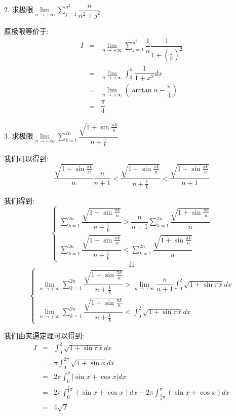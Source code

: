 2. 求极限$\lim\limits_{n\rightarrow+\infty}\sum\limits_{j=1}^{n^2}\dfrac{n}{n^2+j^2}$
\begin{solution}
	
	原极限等价于: 
	\begin{eqnarray*}
		I&=&\lim\limits_{n\rightarrow+\infty}\sum\limits_{j=1}^{n^2}\dfrac{1}{n}\dfrac{1}{1+(\frac{j}{n})^2}\\
		&=&\lim\limits_{n\rightarrow+\infty}\int_{0}^{n}\dfrac{1}{1+x^2}dx\\
		&=&\lim\limits_{n\rightarrow+\infty}(\arctan n-\dfrac{\pi}{4})\\
		&=&\dfrac{\pi}{4}
	\end{eqnarray*}
\end{solution}


3. 求极限$\lim\limits_{n\rightarrow+\infty}\sum\limits_{k=1}^{2n}\dfrac{\sqrt{1+\sin \frac{\pi k}{n}}}{n+\frac{1}{k}}$
\begin{solution}
	
	我们可以得到: 
	$$\dfrac{\sqrt{1+\sin \frac{\pi k}{n}}}{n}\dfrac{n}{n+1}<\dfrac{\sqrt{1+\sin \frac{\pi k}{n}}}{n+\frac{1}{k}}<\dfrac{\sqrt{1+\sin \frac{\pi k}{n}}}{n+1}$$
	
	我们得到: 
	$$\left\lbrace
	\begin{array}{l}
		\sum\limits_{k=1}^{2n}\dfrac{\sqrt{1+\sin \frac{\pi k}{n}}}{n+\frac{1}{k}}>\dfrac{n}{n+1}\sum\limits_{k=1}^{2n}\dfrac{\sqrt{1+\sin \frac{\pi k}{n}}}{n}\\
		\sum\limits_{k=1}^{2n}\dfrac{\sqrt{1+\sin \frac{\pi k}{n}}}{n+\frac{1}{k}}<\sum\limits_{k=1}^{2n}\dfrac{\sqrt{1+\sin \frac{\pi k}{n}}}{n}
	\end{array}
	\right.$$ 
	$$\downdownarrows$$ 
	$$\left\lbrace
	\begin{array}{l}
		\lim\limits_{n\rightarrow+\infty}\sum\limits_{k=1}^{2n}\dfrac{\sqrt{1+\sin \frac{\pi k}{n}}}{n+\frac{1}{k}}>\lim\limits_{n\rightarrow+\infty}\dfrac{n}{n+1}\int_{0}^{2}\sqrt{1+\sin \pi x}dx\\
		\lim\limits_{n\rightarrow+\infty}\sum\limits_{k=1}^{2n}\dfrac{\sqrt{1+\sin \frac{\pi k}{n}}}{n+\frac{1}{k}}<\int_{0}^{2}\sqrt{1+\sin \pi x}dx
	\end{array}
	\right. $$
	
	我们由夹逼定理可以得到: 
	\begin{eqnarray*}
		I&=&\int_{0}^{2}\sqrt{1+\sin \pi x}dx\\
		&=&\pi\int_{0}^{2\pi}\sqrt{1+\sin x}dx\\
		&=&2\pi\int_{0}^{\pi}|\sin x+\cos x|dx\\
		&=&2\pi\int_{0}^{\frac{3}{4}\pi}(\sin x+\cos x)dx-2\pi\int_{\frac{3}{4}\pi}^{\pi}(\sin x+\cos x)dx\\
		&=&4\sqrt{2}
	\end{eqnarray*}
\end{solution}

